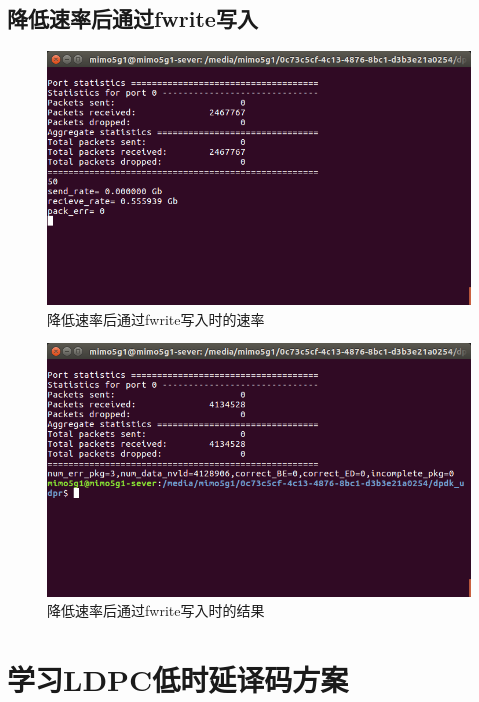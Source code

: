 \documentclass{article}
\begin{document}
\subsection{降低速率后通过fwrite写入}
\begin{figure}[H]
	\centering
	\includegraphics[width = .8\textwidth]{lowrate.png}
	\caption{降低速率后通过fwrite写入时的速率}
\end{figure}
\begin{figure}[H]
	\centering
	\includegraphics[width = .8\textwidth]{lowres.png}
	\caption{降低速率后通过fwrite写入时的结果}
\end{figure}

\section{学习LDPC低时延译码方案}





\end{document}
